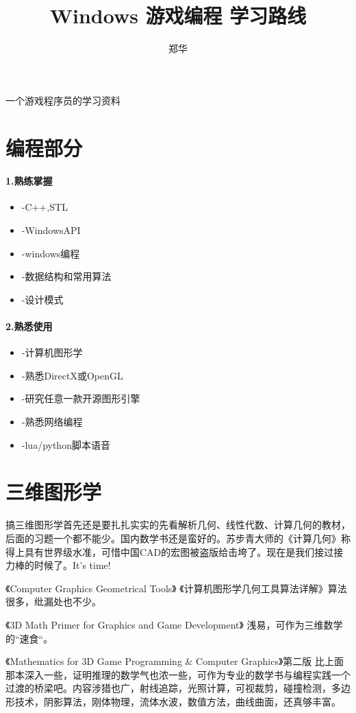 \documentclass[UTF8,a4paper,8pt]{ctexart}
\author{郑华}
\title{Windows 游戏编程 学习路线}
\begin{document}
 
	\maketitle

一个游戏程序员的学习资料

\section{编程部分}
\paragraph{1.熟练掌握}
\begin{itemize}
	\item -C++,STL
	\item -WindowsAPI
	\item -windows编程
	\item -数据结构和常用算法
	\item -设计模式
\end{itemize}
\paragraph{2.熟悉使用}
\begin{itemize}
	\item -计算机图形学
	\item -熟悉DirectX或OpenGL
	\item -研究任意一款开源图形引擎
	\item -熟悉网络编程
	\item -lua/python脚本语音
\end{itemize}
\section{三维图形学}
搞三维图形学首先还是要扎扎实实的先看解析几何、线性代数、计算几何的教材，后面的习题一个都不能少。国内数学书还是蛮好的。苏步青大师的《计算几何》称得上具有世界级水准，可惜中国CAD的宏图被盗版给击垮了。现在是我们接过接力棒的时候了。It’s time!

《Computer Graphics Geometrical Tools》
《计算机图形学几何工具算法详解》算法很多，纰漏处也不少。

《3D Math Primer for Graphics and Game Development》
浅易，可作为三维数学的“速食“。

《Mathematics for 3D Game Programming \& Computer Graphics》第二版
比上面那本深入一些，证明推理的数学气也浓一些，可作为专业的数学书与编程实践一个过渡的桥梁吧。内容涉猎也广，射线追踪，光照计算，可视裁剪，碰撞检测，多边形技术，阴影算法，刚体物理，流体水波，数值方法，曲线曲面，还真够丰富。
\end{document}
